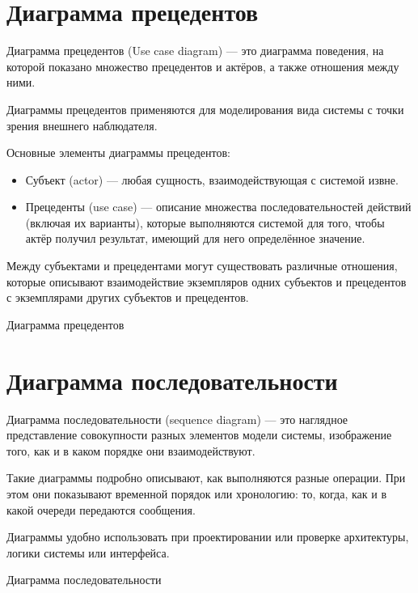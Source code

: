 \section{Диаграмма прецедентов}

Диаграмма прецедентов (Use case diagram) --- это диаграмма поведения,
на которой показано множество прецедентов и актёров,
а также отношения между ними.\par
Диаграммы прецедентов применяются для моделирования вида системы
с точки зрения внешнего наблюдателя.\par
Основные элементы диаграммы прецедентов:

\begin{itemize}
	\item Субъект (actor) --- любая сущность,
		взаимодействующая с системой извне.
	\item Прецеденты (use case) --- описание множества последовательностей
		действий (включая их варианты),
		которые выполняются системой для того,
		чтобы актёр получил результат,
		имеющий для него определённое значение.
\end{itemize}

Между субъектами и прецедентами могут существовать различные отношения,
которые описывают взаимодействие экземпляров одних субъектов
и прецедентов с экземплярами других субъектов и прецедентов.

\begin{image}
	\caption{Диаграмма прецедентов}
	\label{fig:use:case}
\end{image}

\section{Диаграмма последовательности}

Диаграмма последовательности (sequence diagram) --- это наглядное
представление совокупности разных элементов модели системы,
изображение того, как и в каком порядке они взаимодействуют.\par
Такие диаграммы подробно описывают, как выполняются разные операции.
При этом они показывают временной порядок или хронологию:
то, когда, как и в какой очереди передаются сообщения.\par
Диаграммы удобно использовать при проектировании или проверке архитектуры,
логики системы или интерфейса.

\begin{image}
	\caption{Диаграмма последовательности}
	\label{fig:sequence}
\end{image}

